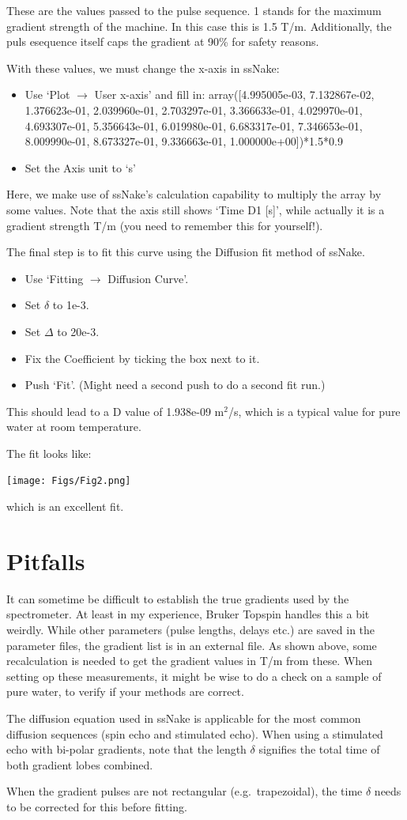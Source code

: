 \documentclass[11pt,a4paper]{article}
\begin{document}
These are the values passed to the pulse sequence. 1 stands for the maximum gradient strength of the machine. In this case this is 1.5 T/m. Additionally, the puls esequence itself caps the gradient at 90\% for safety reasons.

With these values, we must change the
x-axis in ssNake:

\begin{itemize}
  \item Use `Plot $\longrightarrow$ User x-axis' and fill in: array([4.995005e-03, 7.132867e-02, 1.376623e-01,
2.039960e-01, 2.703297e-01, 3.366633e-01, 4.029970e-01,
4.693307e-01, 5.356643e-01, 6.019980e-01, 6.683317e-01,
7.346653e-01, 8.009990e-01, 8.673327e-01, 9.336663e-01,
1.000000e+00])*1.5*0.9
\item Set the Axis unit to `s'
\end{itemize}
Here, we make use of ssNake's calculation capability to multiply the array by some values. Note that
the axis still shows `Time D1 [s]', while actually it is a gradient strength T/m (you need to remember
this for yourself!).

The final step is to fit this curve using the Diffusion fit method of ssNake.

\begin{itemize}
  \item Use `Fitting $\longrightarrow$ Diffusion Curve'.
  \item Set $\delta$ to 1e-3.
  \item Set $\Delta$ to 20e-3.
  \item Fix the Coefficient by ticking the box next to it.
  \item Push `Fit'. (Might need a second push to do a second fit run.)
\end{itemize}
This should lead to a D value of 1.938e-09 m$^2$/s, which is a typical value for pure water at room temperature.

The fit looks like:
\begin{center}
\texttt{[image: Figs/Fig2.png]}
\end{center}
which is an excellent fit.

\section{Pitfalls}
It can sometime be difficult to establish the true gradients used by the spectrometer. At least in my experience, Bruker Topspin handles this a bit weirdly. While other parameters (pulse lengths, delays etc.) are saved in the parameter files, the gradient list is in an external file. As shown above, some recalculation is needed to get the gradient values in T/m from these. When setting op these measurements, it might be wise to do a check on a sample of pure water, to verify if your methods are correct.

The diffusion equation used in ssNake is applicable for the most common diffusion sequences (spin echo and stimulated echo). When using a stimulated echo with bi-polar gradients, note that the length $\delta$ signifies the total time of both gradient lobes combined.

When the gradient pulses are not rectangular (e.g.\ trapezoidal), the time $\delta$ needs to be corrected for this before fitting.
\end{document}

